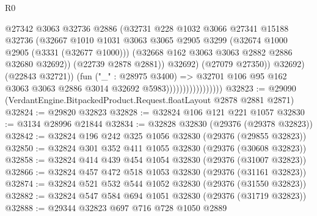 \begin{lexlean}{R0}
\begin{coremodule}
                                            @27342
                                            @3063
                                            @32736
                                            @2886
                                            (@32731
                                              @228
                                              @1032
                                              @3066
                                              @27341
                                              @15188
                                              @32736
                                              (@32667
                                                @1010
                                                @1031
                                                @3063
                                                @3065
                                                @2905
                                                @3299
                                                (@32674 @1000 @2905 (@3331 (@32677 @1000)))
                                                (@32668 @162 @3063 @3063 @2882 @2886 @32680 @32692))
                                              (@22739 @2878 @2881))
                                            @32692)
                                          (@27079 @27350))
                                        @32692)
                                      (@22843 @32721))
                                    (fun ("_" : @28975 @3400) =>
                                    @32701
                                      @106
                                      @95
                                      @162
                                      @3063
                                      @3063
                                      @2886
                                      @3014
                                      @32692
                                      @5983)))))))))))))))))
@32823 := @29090 (VerdantEngine.BitpackedProduct.Request.floatLayout @2878 @2881 @2871)
@32824 := @29820 @32823
@32828 := @32824 @106 @121 @221 @1057
@32830 := @3134 @28996 @21844
@32834 := @32828 @32830 (@29376 (@29378 @32823))
@32842 := @32824 @196 @242 @325 @1056 @32830 (@29376 (@29855 @32823))
@32850 := @32824 @301 @352 @411 @1055 @32830 (@29376 (@30608 @32823))
@32858 := @32824 @414 @439 @454 @1054 @32830 (@29376 (@31007 @32823))
@32866 := @32824 @457 @472 @518 @1053 @32830 (@29376 (@31161 @32823))
@32874 := @32824 @521 @532 @544 @1052 @32830 (@29376 (@31550 @32823))
@32882 := @32824 @547 @584 @694 @1051 @32830 (@29376 (@31719 @32823))
@32888 := @29344 @32823 @697 @716 @728 @1050 @2889

\end{coremodule}
\end{lexlean}

